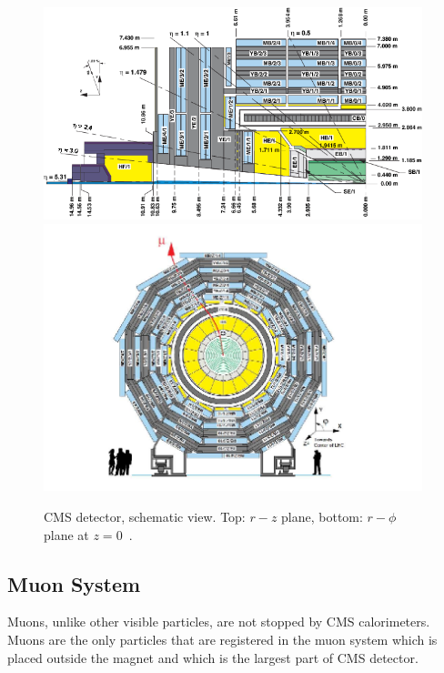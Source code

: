 \begin{figure}[htb]
  \begin{center}
    {\includegraphics[width=0.98\textwidth]{../figs/Exp/CMSview1.png}\\
     \includegraphics[width=0.98\textwidth]{../figs/Exp/CMSview.png}}
    \caption{CMS detector, schematic view. Top: $r-z$ plane, bottom: $r-\phi$ plane at $z=0$~\cite{ref_CMSschemView}. }
    \label{fig:CMSschemView}
  \end{center}
\end{figure}


\subsection{Muon System}

Muons, unlike other visible particles, are not stopped by CMS calorimeters. Muons are the only particles that are registered in the muon system which is placed outside the magnet and which is the largest part of CMS detector.

